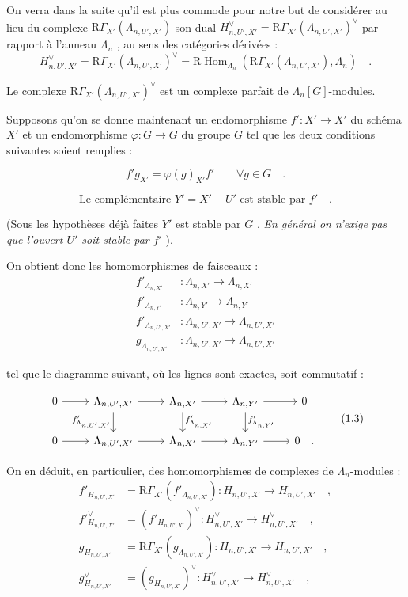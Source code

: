 \documentclass[11pt]{article}
\DeclareMathOperator{\Hom}{Hom}
\newcommand{\R}{\mathrm{R}}\newcommand{\RHomCore}{\mathrm{RHom}}
\providecommand{\Hom}{\operatorname{Hom}}
\providecommand{\R}{\mathrm R}
\providecommand{\La}{\Lambda}
\providecommand{\Hom}{\operatorname{Hom}}
\begin{document}
On verra dans la suite qu'il est plus commode pour notre but de considérer au lieu du complexe $\R\Gamma_{X'}(\La_{n,U',X'})$ son dual $H_{n,U',X'}^\vee = \R\Gamma_{X'}(\La_{n,U',X'})^\vee$ par rapport à l'anneau $\La_n$ , au sens des catégories dérivées :
\[
H_{n,U',X'}^\vee = \R\Gamma_{X'}(\La_{n,U',X'})^\vee = \R\Hom_{\La_n}(\R\Gamma_{X'}(\La_{n,U',X'}), \La_n) \quad .
\]

Le complexe $\R\Gamma_{X'}(\La_{n,U',X'})^\vee$ est un complexe parfait de $\La_n[G]$-modules.

Supposons qu'on se donne maintenant un endomorphisme $f' : X' \to X'$ du schéma $X'$ et un endomorphisme $\varphi : G \to G$ du groupe $G$ tel que les deux conditions suivantes soient remplies :

\begin{equation}\tag{1.1}
f' g_{X'} = \varphi(g)_{X'} f' \qquad \forall g \in G \quad .
\end{equation}

\begin{equation}\tag{1.2}
\text{Le complémentaire } Y' = X' - U' \text{ est stable par } f' \quad .
\end{equation}

(Sous les hypothèses déjà faites $Y'$ est stable par $G$ . \emph{En général on n'exige pas que l'ouvert $U'$ soit stable par $f'$} ).

On obtient donc les homomorphismes de faisceaux :
\begin{align*}
f'_{\La_{n,X'}} &: \La_{n,X'} \longrightarrow \La_{n,X'} \\
f'_{\La_{n,Y'}} &: \La_{n,Y'} \longrightarrow \La_{n,Y'} \\
f'_{\La_{n,U',X'}} &: \La_{n,U',X'} \longrightarrow \La_{n,U',X'} \\
g_{\La_{n,U',X'}} &: \La_{n,U',X'} \longrightarrow \La_{n,U',X'}
\end{align*}

tel que le diagramme suivant, où les lignes sont exactes, soit commutatif :

\[
\begin{tikzcd}
0 \arrow[r] & \La_{n,U',X'} \arrow[r] \arrow[d, "f'_{\La_{n,U',X'}}"'] & \La_{n,X'} \arrow[r] \arrow[d, "f'_{\La_{n,X'}}"] & \La_{n,Y'} \arrow[r] \arrow[d, "f'_{\La_{n,Y'}}"] & 0 \\
0 \arrow[r] & \La_{n,U',X'} \arrow[r] & \La_{n,X'} \arrow[r] & \La_{n,Y'} \arrow[r] & 0 \quad .
\end{tikzcd}
\tag{1.3}
\]

On en déduit, en particulier, des homomorphismes de complexes de $\La_n$-modules :
\begin{align*}
f'_{H_{n,U',X'}} &= \R\Gamma_{X'}(f'_{\La_{n,U',X'}}) : H_{n,U',X'} \longrightarrow H_{n,U',X'} \quad , \\
f'^\vee_{H_{n,U',X'}} &= (f'_{H_{n,U',X'}})^\vee : H_{n,U',X'}^\vee \longrightarrow H_{n,U',X'}^\vee \quad , \\
g_{H_{n,U',X'}} &= \R\Gamma_{X'}(g_{\La_{n,U',X'}}) : H_{n,U',X'} \longrightarrow H_{n,U',X'} \quad , \\
g^\vee_{H_{n,U',X'}} &= (g_{H_{n,U',X'}})^\vee : H_{n,U',X'}^\vee \longrightarrow H_{n,U',X'}^\vee \quad ,
\end{align*}
\end{document}
